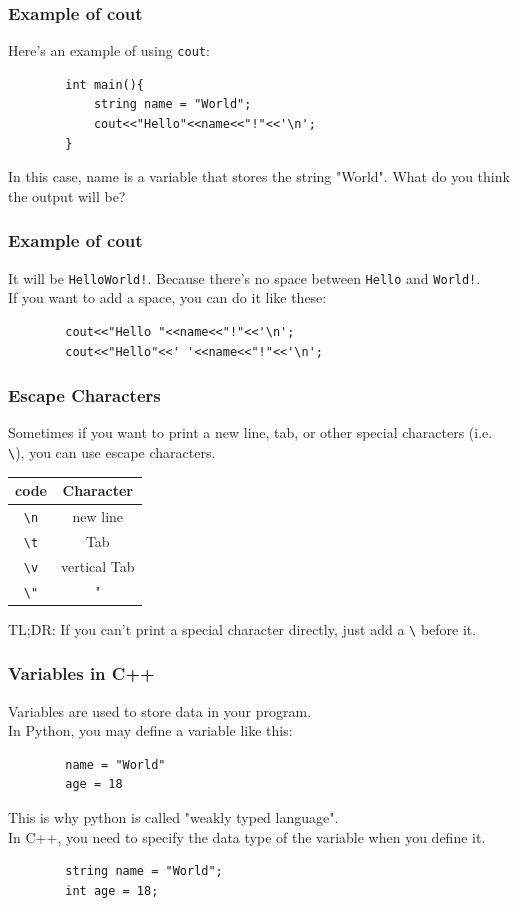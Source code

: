 \documentclass[xcolor=dvipsnames]{beamer}
\begin{document}
    \begin{frame}[fragile]
        \frametitle{Example of cout}
        Here's an example of using \texttt{cout}:
        \begin{verbatim}
        int main(){
            string name = "World";
            cout<<"Hello"<<name<<"!"<<'\n';
        }
        \end{verbatim}
        In this case, name is a variable that stores the string "World". What do you think the output will be?
    \end{frame}

    \begin{frame}[fragile]
        \frametitle{Example of cout}
        It will be \texttt{HelloWorld!}. Because there's no space between \texttt{Hello} and \texttt{World!}.\\
        If you want to add a space, you can do it like these:
        \begin{verbatim}
        cout<<"Hello "<<name<<"!"<<'\n';
        cout<<"Hello"<<' '<<name<<"!"<<'\n';
        \end{verbatim}
    \end{frame}

    \begin{frame}
        \frametitle{Escape Characters}
        Sometimes if you want to print a new line, tab, or other special characters (i.e. \texttt{\textbackslash}), you can use escape characters.\\

        \begin{table}[H]
        \begin{tabular}{cc}
        \toprule
        code & Character \\
        \midrule
        \texttt{\textbackslash n} & new line \\
        \texttt{\textbackslash t} & Tab \\
        \texttt{\textbackslash v} & vertical Tab \\
        \texttt{\textbackslash "} & " \\
        \bottomrule
        \end{tabular}
        \end{table}
        TL;DR: If you can't print a special character directly, just add a \texttt{\textbackslash} before it.
    \end{frame}

    \begin{frame}[fragile]
        \frametitle{Variables in C++}
        Variables are used to store data in your program.\\
        In Python, you may define a variable like this:
        \begin{verbatim}
        name = "World"
        age = 18
        \end{verbatim}
        This is why python is called "weakly typed language".\\
        In C++, you need to specify the data type of the variable when you define it.
        \begin{verbatim}
        string name = "World";
        int age = 18;
        \end{verbatim}
    \end{frame}
\end{document}
